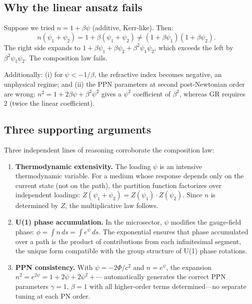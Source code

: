 \documentclass[aps,prd,twocolumn,superscriptaddress,nofootinbib]{revtex4-2}
\begin{document}
\subsection{Why the linear ansatz fails}

Suppose we tried $n = 1 + \beta\psi$ (additive, Kerr-like).  Then:
\begin{equation}
n(\psi_1 + \psi_2) = 1 + \beta(\psi_1 + \psi_2)
\neq (1 + \beta\psi_1)(1 + \beta\psi_2).
\label{eq:linear-fails}
\end{equation}
The right side expands to
$1 + \beta\psi_1 + \beta\psi_2 + \beta^2\psi_1\psi_2$, which exceeds
the left by $\beta^2\psi_1\psi_2$.  The composition law fails.

Additionally: (i) for $\psi < -1/\beta$, the refractive index becomes
negative, an unphysical regime; and (ii) the PPN parameters at second
post-Newtonian order are wrong: $n^2 = 1 + 2\beta\psi +
\beta^2\psi^2$ gives a $\psi^2$ coefficient of $\beta^2$, whereas GR
requires $2$ (twice the linear coefficient).

\subsection{Three supporting arguments}

Three independent lines of reasoning corroborate the composition law:
\begin{enumerate}
\item \textbf{Thermodynamic extensivity.}
The loading $\psi$ is an intensive thermodynamic variable.  For a
medium whose response depends only on the current state (not on the
path), the partition function factorizes over independent loadings:
$Z(\psi_1 + \psi_2) = Z(\psi_1) \cdot Z(\psi_2)$.  Since $n$ is
determined by $Z$, the multiplicative law follows.

\item \textbf{U(1) phase accumulation.}
In the microsector, $\psi$ modifies the gauge-field phase:
$\phi = \int n\,ds = \int e^\psi\,ds$.  The exponential ensures that
phase accumulated over a path is the product of contributions from
each infinitesimal segment, the unique form compatible with the group
structure of U(1) phase rotations.

\item \textbf{PPN consistency.}
With $\psi = -2\Phi/c^2$ and $n = e^\psi$, the expansion
$n^2 = e^{2\psi} = 1 + 2\psi + 2\psi^2 + \cdots$ automatically
generates the correct PPN parameters $\gamma = 1$, $\beta = 1$ with
all higher-order terms determined---no separate tuning at each PN
order.
\end{enumerate}
\end{document}
